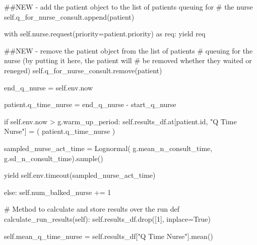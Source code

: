 \documentclass[
  letterpaper,
  DIV=11,
  numbers=noendperiod]{scrreprt}
\newenvironment{Shaded}{\begin{snugshade}}{\end{snugshade}}
\newcommand{\BuiltInTok}[1]{\textcolor[rgb]{0.00,0.23,0.31}{#1}}
\newcommand{\CommentTok}[1]{\textcolor[rgb]{0.37,0.37,0.37}{#1}}
\newcommand{\ControlFlowTok}[1]{\textcolor[rgb]{0.00,0.23,0.31}{#1}}
\newcommand{\DecValTok}[1]{\textcolor[rgb]{0.68,0.00,0.00}{#1}}
\newcommand{\ImportTok}[1]{\textcolor[rgb]{0.00,0.46,0.62}{#1}}
\newcommand{\KeywordTok}[1]{\textcolor[rgb]{0.00,0.23,0.31}{#1}}
\newcommand{\NormalTok}[1]{\textcolor[rgb]{0.00,0.23,0.31}{#1}}
\newcommand{\OperatorTok}[1]{\textcolor[rgb]{0.37,0.37,0.37}{#1}}
\newcommand{\StringTok}[1]{\textcolor[rgb]{0.13,0.47,0.30}{#1}}
\newcommand{\VariableTok}[1]{\textcolor[rgb]{0.07,0.07,0.07}{#1}}
\begin{document}
\begin{tcolorbox}
\begin{Shaded}
\begin{Highlighting}[]
            \CommentTok{\#\#NEW {-} add the patient object to the list of patients queuing for}
            \CommentTok{\# the nurse}
            \VariableTok{self}\NormalTok{.q\_for\_nurse\_consult.append(patient)}

            \ControlFlowTok{with} \VariableTok{self}\NormalTok{.nurse.request(priority}\OperatorTok{=}\NormalTok{patient.priority) }\ImportTok{as}\NormalTok{ req:}
                \ControlFlowTok{yield}\NormalTok{ req}

                \CommentTok{\#\#NEW {-} remove the patient object from the list of patients}
                \CommentTok{\# queuing for the nurse (by putting it here, the patient will}
                \CommentTok{\# be removed whether they waited or reneged)}
                \VariableTok{self}\NormalTok{.q\_for\_nurse\_consult.remove(patient)}

\NormalTok{                end\_q\_nurse }\OperatorTok{=} \VariableTok{self}\NormalTok{.env.now}

\NormalTok{                patient.q\_time\_nurse }\OperatorTok{=}\NormalTok{ end\_q\_nurse }\OperatorTok{{-}}\NormalTok{ start\_q\_nurse}

                \ControlFlowTok{if} \VariableTok{self}\NormalTok{.env.now }\OperatorTok{\textgreater{}}\NormalTok{ g.warm\_up\_period:}
                    \VariableTok{self}\NormalTok{.results\_df.at[patient.}\BuiltInTok{id}\NormalTok{, }\StringTok{"Q Time Nurse"}\NormalTok{] }\OperatorTok{=}\NormalTok{ (}
\NormalTok{                        patient.q\_time\_nurse}
\NormalTok{                    )}

\NormalTok{                sampled\_nurse\_act\_time }\OperatorTok{=}\NormalTok{ Lognormal(}
\NormalTok{                    g.mean\_n\_consult\_time, g.sd\_n\_consult\_time).sample()}

                \ControlFlowTok{yield} \VariableTok{self}\NormalTok{.env.timeout(sampled\_nurse\_act\_time)}

        \ControlFlowTok{else}\NormalTok{:}
            \VariableTok{self}\NormalTok{.num\_balked\_nurse }\OperatorTok{+=} \DecValTok{1}

    \CommentTok{\# Method to calculate and store results over the run}
    \KeywordTok{def}\NormalTok{ calculate\_run\_results(}\VariableTok{self}\NormalTok{):}
        \VariableTok{self}\NormalTok{.results\_df.drop([}\DecValTok{1}\NormalTok{], inplace}\OperatorTok{=}\VariableTok{True}\NormalTok{)}

        \VariableTok{self}\NormalTok{.mean\_q\_time\_nurse }\OperatorTok{=} \VariableTok{self}\NormalTok{.results\_df[}\StringTok{"Q Time Nurse"}\NormalTok{].mean()}


\end{Highlighting}
\end{Shaded}
\end{tcolorbox}
\end{document}
